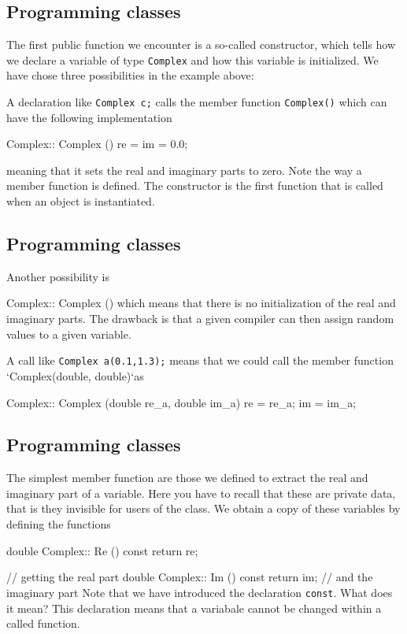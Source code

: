 \documentclass[%
oneside,                 %
final,                   %
10pt]{article}
\begin{document}
{{{{{{{{{%
\subsection{Programming classes}

The first public function we encounter is a so-called
constructor, which  tells how we declare a variable of type \Verb!Complex!
and how this variable is initialized. We have chose  three possibilities in the example above:

A declaration like \Verb!Complex c;! calls the member function \Verb!Complex()! which can have the following implementation

\bcppcod
Complex:: Complex () { re = im = 0.0; }
\ecppcod

meaning that it sets the real and imaginary parts to zero. Note the
way a member function is defined. The constructor is the first
function that is called when an object is instantiated.

\subsection{Programming classes}

Another possibility is

\bcppcod
Complex:: Complex () {}
\ecppcod
which means that there is no initialization of the real and imaginary parts. The drawback is that a given compiler can then assign random values to a given variable.

A call like \Verb!Complex a(0.1,1.3);! means that we could call the member function `Complex(double, double)`as

\bcppcod
Complex:: Complex (double re_a, double im_a) {
    re = re_a; im = im_a; }
\ecppcod

\subsection{Programming classes}

The simplest member function are those we defined to extract
the real and imaginary part of a variable. Here you have to recall that these are private data,
that is they invisible for users of the class.  We obtain a copy of these variables by defining the
functions

\bcppcod
double Complex:: Re () const { return re; }} //  getting the real part
double Complex:: Im () const { return im; }  //   and the imaginary part
\ecppcod
Note that we have introduced   the declaration  \Verb!const!.  What does it mean?
This declaration means that a variabale cannot be changed within  a called function.

}}}}}}}}
\end{document}
